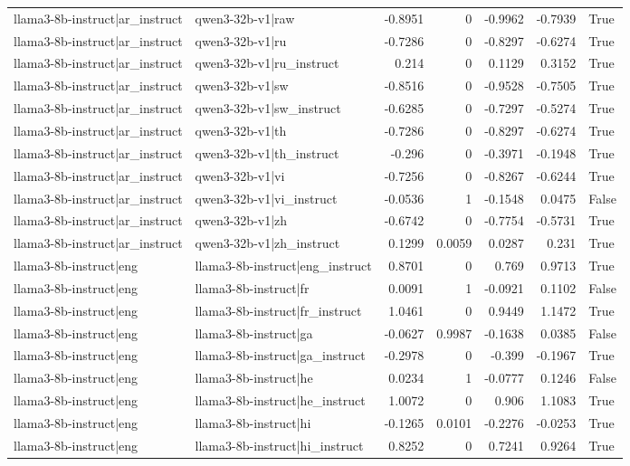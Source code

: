 \begin{table}
\begin{tabular}{l l r r r r l}
llama3-8b-instruct|ar_instruct & qwen3-32b-v1|raw & -0.8951 & 0 & -0.9962 & -0.7939 & True \\
llama3-8b-instruct|ar_instruct & qwen3-32b-v1|ru & -0.7286 & 0 & -0.8297 & -0.6274 & True \\
llama3-8b-instruct|ar_instruct & qwen3-32b-v1|ru_instruct & 0.214 & 0 & 0.1129 & 0.3152 & True \\
llama3-8b-instruct|ar_instruct & qwen3-32b-v1|sw & -0.8516 & 0 & -0.9528 & -0.7505 & True \\
llama3-8b-instruct|ar_instruct & qwen3-32b-v1|sw_instruct & -0.6285 & 0 & -0.7297 & -0.5274 & True \\
llama3-8b-instruct|ar_instruct & qwen3-32b-v1|th & -0.7286 & 0 & -0.8297 & -0.6274 & True \\
llama3-8b-instruct|ar_instruct & qwen3-32b-v1|th_instruct & -0.296 & 0 & -0.3971 & -0.1948 & True \\
llama3-8b-instruct|ar_instruct & qwen3-32b-v1|vi & -0.7256 & 0 & -0.8267 & -0.6244 & True \\
llama3-8b-instruct|ar_instruct & qwen3-32b-v1|vi_instruct & -0.0536 & 1 & -0.1548 & 0.0475 & False \\
llama3-8b-instruct|ar_instruct & qwen3-32b-v1|zh & -0.6742 & 0 & -0.7754 & -0.5731 & True \\
llama3-8b-instruct|ar_instruct & qwen3-32b-v1|zh_instruct & 0.1299 & 0.0059 & 0.0287 & 0.231 & True \\
llama3-8b-instruct|eng & llama3-8b-instruct|eng_instruct & 0.8701 & 0 & 0.769 & 0.9713 & True \\
llama3-8b-instruct|eng & llama3-8b-instruct|fr & 0.0091 & 1 & -0.0921 & 0.1102 & False \\
llama3-8b-instruct|eng & llama3-8b-instruct|fr_instruct & 1.0461 & 0 & 0.9449 & 1.1472 & True \\
llama3-8b-instruct|eng & llama3-8b-instruct|ga & -0.0627 & 0.9987 & -0.1638 & 0.0385 & False \\
llama3-8b-instruct|eng & llama3-8b-instruct|ga_instruct & -0.2978 & 0 & -0.399 & -0.1967 & True \\
llama3-8b-instruct|eng & llama3-8b-instruct|he & 0.0234 & 1 & -0.0777 & 0.1246 & False \\
llama3-8b-instruct|eng & llama3-8b-instruct|he_instruct & 1.0072 & 0 & 0.906 & 1.1083 & True \\
llama3-8b-instruct|eng & llama3-8b-instruct|hi & -0.1265 & 0.0101 & -0.2276 & -0.0253 & True \\
llama3-8b-instruct|eng & llama3-8b-instruct|hi_instruct & 0.8252 & 0 & 0.7241 & 0.9264 & True \\

\end{tabular}
\end{table}
